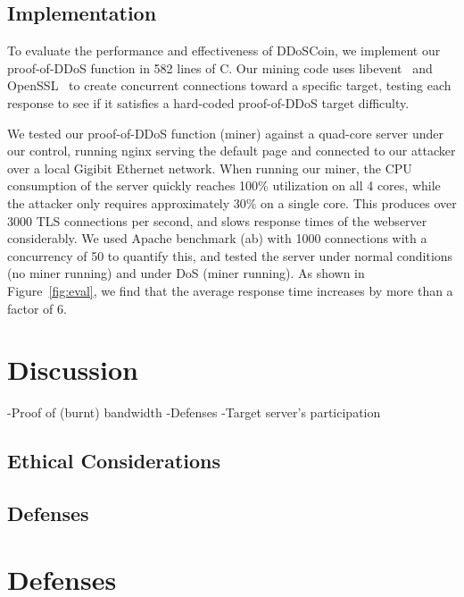 

\subsection{Implementation}

\FigEval

To evaluate the performance and effectiveness of DDoSCoin, we implement our
proof-of-DDoS function in 582 lines of C. Our mining code uses
libevent~\cite{libevent} and OpenSSL~\cite{openssl} to create concurrent
connections toward a specific target, testing each response to see if it
satisfies a hard-coded proof-of-DDoS target difficulty.

We tested our proof-of-DDoS function (miner) against a quad-core server under
our control, running nginx serving the default page and connected to our
attacker over a local Gigibit Ethernet network. When running our miner, the CPU
consumption of the server quickly reaches 100\% utilization on all 4 cores,
while the attacker only requires approximately 30\% on a single core. This
produces over 3000 TLS connections per second, and slows response times of the
webserver considerably. We used Apache benchmark (ab) with 1000 connections with
a concurrency of 50 to quantify this, and tested the server under normal
conditions (no miner running) and under DoS (miner running). As shown in
Figure~\ref{fig:eval}, we find that the average response time increases by more
than a factor of 6.

\section{Discussion}

-Proof of (burnt) bandwidth
-Defenses
-Target server's participation

\subsection{Ethical Considerations}
\shrug


\subsection{Defenses}
\fi
\section{Defenses}

